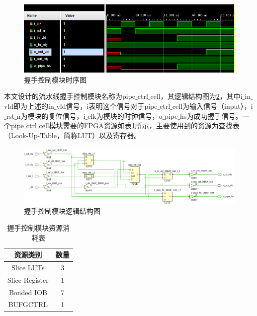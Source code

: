 \begin{figure}[htb]
    \centering
    \includegraphics[width=14cm]{fig/5-fig/握手控制模块时序图.jpg}
    \caption{握手控制模块时序图}
    \label{fig:握手控制模块时序图}
\end{figure}

本文设计的流水线握手控制模块名称为pipe$\_$ctrl$\_$cell，其逻辑结构图为\ref{fig:握手控制模块逻辑结构图}，其中i$\_$in$\_$vld即为上述的in$\_$vld信号，i表明这个信号对于pipe$\_$ctrl$\_$cell为输入信号（input），i$\_$rst$\_$n为模块的复位信号，i$\_$clk为模块的时钟信号，o$\_$pipe$\_$hs为成功握手信号。一个pipe$\_$ctrl$\_$cell模块需要的FPGA资源如表\ref{tab:握手控制模块资源消耗表}所示，主要使用到的资源为查找表（Look-Up-Table，简称LUT）以及寄存器。
\begin{figure}[htb]
    \centering
    \includegraphics[width=14cm]{fig/5-fig/握手控制模块逻辑结构图.jpg}
    \caption{握手控制模块逻辑结构图}
    \label{fig:握手控制模块逻辑结构图}
  \end{figure}

  \begin{table}[H]
    \centering
    \caption{握手控制模块资源消耗表}
    \label{tab:握手控制模块资源消耗表}
    \begin{tabular}{c|c}
        \hline
        资源类别             & 数量  \\ \hline
        Slice LUTs          & 3     \\ \hline
        Slice Register      & 1     \\ \hline
        Bonded IOB          & 7     \\ \hline
        BUFGCTRL            & 1     \\ \hline
    \end{tabular}
  \end{table}

